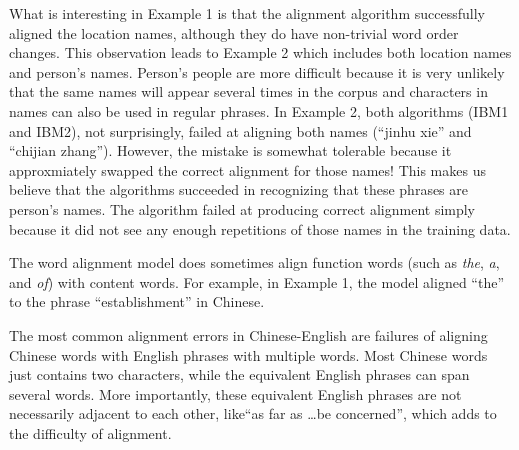 \documentclass[letterpaper]{article}
\begin{document}
What is interesting in Example 1 is that the alignment algorithm successfully aligned the location names, although they do have non-trivial word order changes.
This observation leads to Example 2 which includes both location names and person's names.
Person's people are more difficult because it is very unlikely that the same names will appear several times in the corpus and characters in names can also be used 
in regular phrases.
In Example 2, both algorithms (IBM1 and IBM2), not surprisingly, failed at aligning both names (``jinhu xie'' and ``chijian zhang'').
However, the mistake is somewhat tolerable because it approxmiately swapped the correct alignment for those names! This makes us believe that the algorithms succeeded in recognizing that these phrases are person's names. The algorithm failed at producing correct alignment simply because it did not see any enough repetitions of those names in the training data.

\vspace{0.1cm}

The word alignment model does sometimes align function words (such as \emph{the}, \emph{a}, and \emph{of}) with content words. For example, in Example 1, the model aligned ``the'' to the phrase ``establishment'' in Chinese.

\vspace{0.1cm}

The most common alignment errors in Chinese-English are failures of aligning Chinese words with English phrases with multiple words. Most Chinese words just contains two characters, while the equivalent English phrases can span several words. More importantly, these equivalent English phrases are not necessarily adjacent to each other, like``as far as \dots be concerned'', which adds to the difficulty of alignment.
\end{document}
